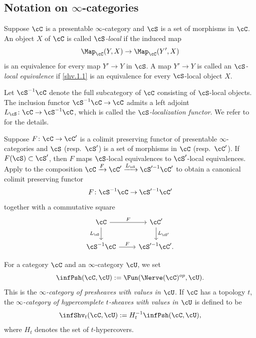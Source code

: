 \documentclass[10pt]{amsart}
\begin{document}
\subsection{Notation on \texorpdfstring{$\infty$-}{infinity }categories}
\label{notation}
\begin{df}
\label{shv.1}
Suppose $\cC$ is a presentable $\infty$-category and $\cS$ is a set of morphisms in $\cC$.
An object $X$ of $\cC$ is called \emph{$\cS$-local} if the induced map
\begin{equation}
\label{shv.1.1}
\Map_{\cC}(Y,X)\to \Map_{\cC}(Y',X)
\end{equation}
is an equivalence for every map $Y'\to Y$ in $\cS$.
A map $Y'\to Y$ is called an \emph{$\cS$-local equivalence} if \eqref{shv.1.1} is an equivalence for every $\cS$-local object $X$.

Let $\cS^{-1}\cC$ denote the full subcategory of $\cC$ consisting of $\cS$-local objects.
The inclusion functor $\cS^{-1}\cC\to \cC$ admits a left adjoint $L_{\cS}\colon \cC\to \cS^{-1}\cC$, which is called the \emph{$\cS$-localization functor}.
We refer to \cite[Section 5.5.4]{HTT} for the details.
\end{df}

\begin{const}
\label{shv.3}
Suppose $F\colon \cC\to \cC'$ is a colimit preserving functor of presentable $\infty$-categories and $\cS$ (resp.\ $\cS'$) is a set of morphisms in $\cC$ (resp.\ $\cC'$).
If $F(\cS)\subset \cS'$, then $F$ maps $\cS$-local equivalences to $\cS'$-local equivalences.
Apply \cite[Proposition 5.5.4.20]{HTT} to the composition $\cC\xrightarrow{F} \cC'\xrightarrow{L_{\cS}}\cS'^{-1}\cC'$ to obtain a canonical colimit preserving functor
\[
F\colon \cS^{-1}\cC\to \cS'^{-1}\cC'
\]
together with a commutative square
\begin{equation}
\label{shv.3.2}
\begin{tikzcd}
\cC\ar[r,"F"]\ar[d,"L_{\cS}"']&
\cC'\ar[d,"L_{\cS'}"]
\\
\cS^{-1}\cC\ar[r,"F"]&
\cS'^{-1}\cC'.
\end{tikzcd}
\end{equation}
\end{const}

\begin{df}
\label{shv.4}
For a category $\cC$ and an $\infty$-category $\cU$, we set
\[
\infPsh(\cC,\cU):=\Fun(\Nerve(\cC)^{op},\cU).
\]
This is the \emph{$\infty$-category of presheaves with values in $\cU$}.
If $\cC$ has a topology $t$, the \emph{$\infty$-category of hypercomplete $t$-sheaves with values in $\cU$} is defined to be
\[
\infShv_t(\cC,\cU):=H_t^{-1}\infPsh(\cC,\cU),
\]
where $H_t$ denotes the set of $t$-hypercovers.
\end{df}
\end{document}
